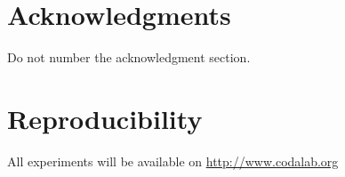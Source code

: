 \documentclass[11pt,letterpaper]{article}
\begin{document}
\section*{Acknowledgments}
Do not number the acknowledgment section.

\section*{Reproducibility}
All experiments will be available on 
\url{http://www.codalab.org}



\end{document}
